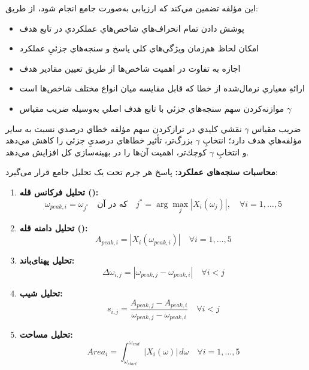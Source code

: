 اين مؤلفه تضمين مي‌كند كه ارزيابي به‌صورت جامع انجام شود، از طريق:
\begin{itemize}
    \item پوشش دادن تمام انحراف‌هاي شاخص‌هاي عملكردي در تابع هدف
    \item امكان لحاظ هم‌زمان ويژگي‌هاي كلي پاسخ و سنجه‌هاي جزئيِ عملكرد
    \item اجازه به تفاوت در اهميت شاخص‌ها از طريق تعيين مقادير هدف
    \item ارائهِ معياري نرمال‌شده از خطا كه قابل مقايسه ميان انواع مختلف شاخص‌ها است
    \item موازنه‌كردن سهم سنجه‌هاي جزئي با تابع هدف اصلي به‌وسيله ضريب مقياس $\gamma$
\end{itemize}

ضريب مقياس $\gamma$ نقشي كليدي در ترازكردن سهم مؤلفه خطاي درصدي نسبت به ساير مؤلفه‌هاي هدف دارد؛ انتخابِ $\gamma$ بزرگ‌تر، تأثير خطاهاي درصديِ جزئي را كاهش مي‌دهد و انتخابِ $\gamma$ كوچك‌تر، اهميت آن‌ها را در بهينه‌سازي كل افزايش مي‌دهد.


\textbf{محاسبات سنجه‌های عملکرد:} پاسخ هر جرم تحت یک تحلیل جامع قرار می‌گیرد:

\begin{enumerate}
    \item \textbf{تحلیل فرکانس قله ():}
    \begin{equation}\label{Eq.peak_frequency_analysis_detailed}
    \omega_{peak,i} = \omega_{j^*} \quad \text{که در آن} \quad j^* = \arg\max_{j} |X_i(\omega_j)|, \quad \forall i = 1,\ldots,5
    \end{equation}

    \item \textbf{تحلیل دامنه قله ():}
    \begin{equation}\label{Eq.peak_amplitude_analysis_detailed}
    A_{peak,i} = |X_i(\omega_{peak,i})| \quad \forall i = 1,\ldots,5
    \end{equation}

    \item \textbf{تحلیل پهنای‌باند:}
    \begin{equation}\label{Eq.bandwidth_analysis_detailed}
    \Delta\omega_{i,j} = |\omega_{peak,j} - \omega_{peak,i}| \quad \forall i < j
    \end{equation}

    \item \textbf{تحلیل شیب:}
    \begin{equation}\label{Eq.slope_analysis_detailed}
    s_{i,j} = \frac{A_{peak,j} - A_{peak,i}}{\omega_{peak,j} - \omega_{peak,i}} \quad \forall i < j
    \end{equation}

    \item \textbf{تحلیل مساحت:}
    \begin{equation}\label{Eq.area_analysis_detailed}
    Area_i = \int_{\omega_{start}}^{\omega_{end}} |X_i(\omega)| \, d\omega \quad \forall i = 1,\ldots,5
    \end{equation}
\end{enumerate}

